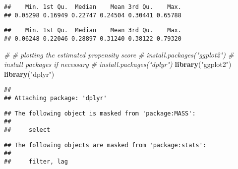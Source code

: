 \documentclass[10pt,]{book}
\newenvironment{Shaded}{\begin{snugshade}}{\end{snugshade}}
\newcommand{\CommentTok}[1]{\textcolor[rgb]{0.56,0.35,0.01}{\textit{#1}}}
\newcommand{\DataTypeTok}[1]{\textcolor[rgb]{0.13,0.29,0.53}{#1}}
\newcommand{\DecValTok}[1]{\textcolor[rgb]{0.00,0.00,0.81}{#1}}
\newcommand{\KeywordTok}[1]{\textcolor[rgb]{0.13,0.29,0.53}{\textbf{#1}}}
\newcommand{\NormalTok}[1]{#1}
\newcommand{\OperatorTok}[1]{\textcolor[rgb]{0.81,0.36,0.00}{\textbf{#1}}}
\newcommand{\StringTok}[1]{\textcolor[rgb]{0.31,0.60,0.02}{#1}}
\begin{document}
\begin{Shaded}
\end{Shaded}

\begin{verbatim}
##    Min. 1st Qu.  Median    Mean 3rd Qu.    Max. 
## 0.05298 0.16949 0.22747 0.24504 0.30441 0.65788
\end{verbatim}

\begin{Shaded}
\end{Shaded}

\begin{verbatim}
##    Min. 1st Qu.  Median    Mean 3rd Qu.    Max. 
## 0.06248 0.22046 0.28897 0.31240 0.38122 0.79320
\end{verbatim}

\begin{Shaded}
\begin{Highlighting}[]
\CommentTok{# # plotting the estimated propensity score}
\CommentTok{# install.packages("ggplot2") # install packages if necessary}
\CommentTok{# install.packages("dplyr")}
\KeywordTok{library}\NormalTok{(}\StringTok{"ggplot2"}\NormalTok{)}
\KeywordTok{library}\NormalTok{(}\StringTok{"dplyr"}\NormalTok{)}
\end{Highlighting}
\end{Shaded}

\begin{verbatim}
## 
## Attaching package: 'dplyr'
\end{verbatim}

\begin{verbatim}
## The following object is masked from 'package:MASS':
## 
##     select
\end{verbatim}

\begin{verbatim}
## The following objects are masked from 'package:stats':
## 
##     filter, lag
\end{verbatim}
\end{document}
